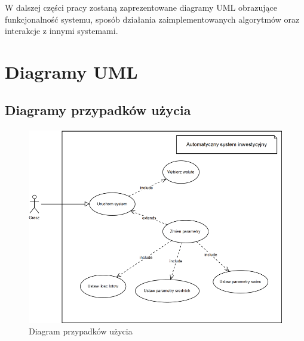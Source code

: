 \documentclass[pdflatex,11pt]{aghdpl}
\begin{document}
W dalszej części pracy zostaną zaprezentowane diagramy UML obrazujące funkcjonalność systemu, sposób działania zaimplementowanych algorytmów oraz interakcje z innymi systemami.



\section{Diagramy UML}
\paragraph{}

\subsection{Diagramy przypadków użycia}
\paragraph{}

\begin{figure}[H]
\begin{center}
\includegraphics[width=16cm]{usecase.PNG}
\caption{Diagram przypadków użycia}
\label{usecase}
\end{center}
\end{figure} 
\end{document}
